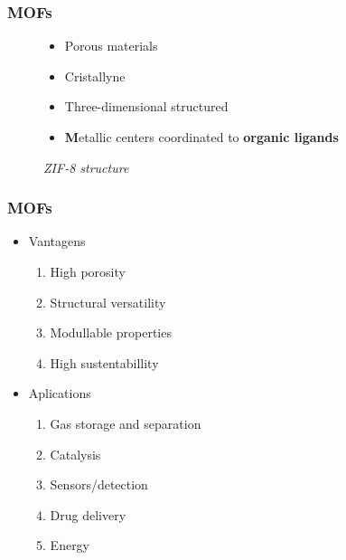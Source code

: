 \documentclass[aspectratio=169,fleqn,table]{beamer}
\begin{document}
\begingroup
{}
\begin{frame}
\frametitle{MOFs}

\begin{figure}
\centering
\begin{minipage}[border=15pt]{0.47\textwidth}
	\centering
	\vspace{-175pt}
    \begin{itemize}
        \item
        Porous materials
        \item
        Cristallyne
        \item
        Three-dimensional structured
        \item
        \textbf
        Metallic centers coordinated to \textbf{organic ligands}
    \end{itemize}
\end{minipage}
\hfill
\begin{minipage}[b]{0.5\textwidth}
	\centering
	\vspace{-35pt}
    \caption{%
    \textit{ZIF-8 structure}}
\end{minipage}
\end{figure}

\end{frame}
\endgroup


\begin{frame}
\frametitle{MOFs}

\begin{itemize}
    \item{Vantagens}
    \begin{enumerate}
        \item
        High porosity
        \item
        Structural versatility
        \item
        Modullable properties
        \item
        High sustentabillity
    \end{enumerate}
    \item{Aplications}
    \begin{enumerate}
        \item
        Gas storage and separation
        \item
        Catalysis
        \item
        Sensors/detection
        \item
        Drug delivery
        \item
        Energy
    \end{enumerate}
\end{itemize}

\end{frame}
\end{document}
